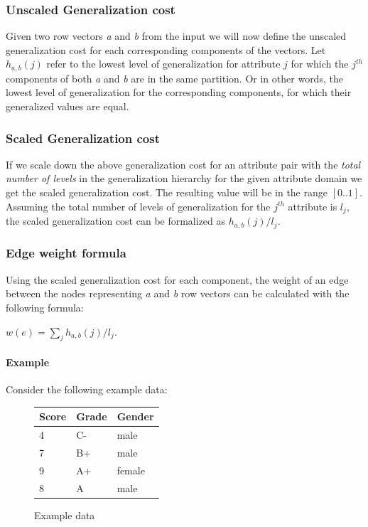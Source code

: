 \subsubsection{Unscaled Generalization cost}

Given two row vectors \textit{a} and \textit{b} from the input we will now define the unscaled generalization cost for each corresponding components of the vectors. Let \(h_{a,b}(j)\) refer to the lowest level of generalization for attribute \(j\) for which the \(j^{th}\) components of both \textit{a} and \textit{b} are in the same partition. \cite{aggarwal} Or in other words, the lowest level of generalization for the corresponding components, for which their generalized values are equal.

\subsubsection{Scaled Generalization cost}

If we scale down the above generalization cost for an attribute pair with the \textit{total number of levels} in the generalization hierarchy for the given attribute domain we get the scaled generalization cost. The resulting value will be in the range \([0..1]\). Assuming the total number of levels of generalization for the \(j^{th}\) attribute is \(l_j\), the scaled generalization cost can be formalized as \(h_{a,b}(j) / l_j\). \cite{aggarwal}

\subsubsection{Edge weight formula}

Using the scaled generalization cost for each component, the weight of an edge between the nodes representing \textit{a} and \textit{b} row vectors can be calculated with the following formula:
\begin{center}
	\(w(e)=\sum_{j}h_{a,b}(j)/l_j\).
\end{center}


\paragraph{Example} Consider the following example data:

\vspace{1cm}
\begin{figure}[H]
	\centering
	\small
	\begin{tabular}{|l|l|l|}
		\hline
		\textbf{Score} & \textbf{Grade} & \textbf{Gender} \\
		\hline
        4 & C- & male \\
		7 & B+ & male \\
		9 & A+ & female \\
        8 & A  & male \\
		\hline
	\end{tabular}
	\caption{Example data}
	\label{fig:unscaled_generalization_cost_example}
\end{figure}

